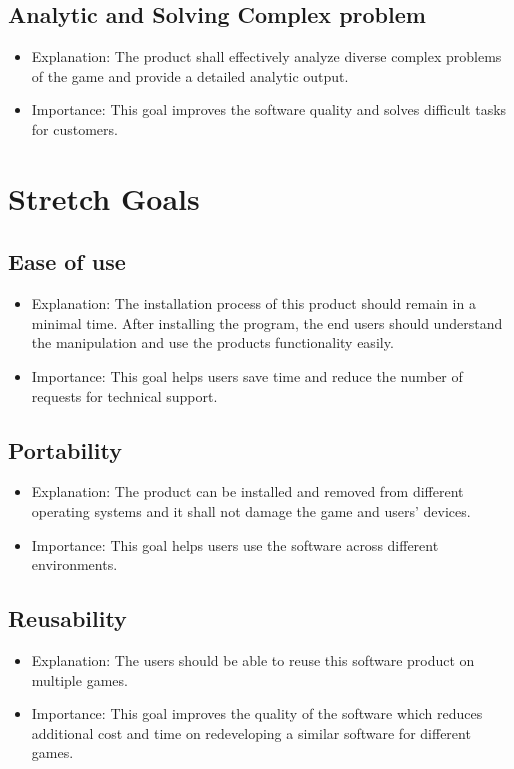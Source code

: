 \documentclass{article}
\begin{document}
\subsection{Analytic and Solving Complex problem}
\begin{itemize}
\item Explanation: The product shall effectively analyze diverse complex problems of the game and provide a detailed analytic output. 
\item Importance: This goal improves the software quality and solves difficult tasks for customers.
\end{itemize}


\section{Stretch Goals}
\subsection{Ease of use}
\begin{itemize}
\item Explanation: The installation process of this product should remain in a minimal time. After installing the program, the end users should understand the manipulation and use the products functionality easily. 
\item Importance: This goal helps users save time and reduce the number of requests for technical support.
\end{itemize}

\subsection{Portability}
\begin{itemize}
\item Explanation: The product can be installed and removed from different operating systems and it shall not damage the game and users' devices.
\item Importance: This goal helps users use the software across different environments. 
\end{itemize}

\subsection{Reusability}
\begin{itemize}
\item Explanation: The users should be able to reuse this software product on multiple games.
\item Importance: This goal improves the quality of the software which reduces additional cost and time on redeveloping a similar software for different games.
\end{itemize}
\end{document}
